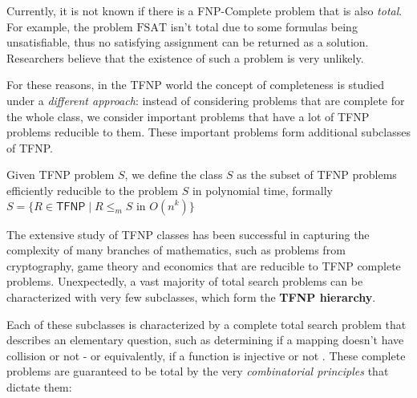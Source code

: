 Currently, it is not known if there is a \textsf{FNP}-Complete problem that is also \textit{total}. For example, the problem $\mathrm{FSAT}$ isn't total due to some formulas being unsatisfiable, thus no satisfying assignment can be returned as a solution. Researchers believe that the existence of such a problem is very unlikely. 

For these reasons, in the \textsf{TFNP} world the concept of completeness is studied under a \textit{different approach}: instead of considering problems that are complete for the whole class, we consider important problems that have a lot of \textsf{TFNP} problems reducible to them. These important problems form additional subclasses of \textsf{TFNP}.  

\begin{definition}
 Given \textsf{TFNP} problem $S$, we define the class $S$ as the subset of \textsf{TFNP} problems efficiently reducible to the problem $S$ in polynomial time, formally $S = \{R \in \mathsf{TFNP} \mid R \leq_m S \text{ in } O(n^k)\}$
\end{definition}

The extensive study of \textsf{TFNP} classes has been successful in capturing the complexity of many branches of mathematics, such as problems from cryptography, game theory and economics that are reducible to TFNP complete problems. Unexpectedly, a vast majority of total search problems can be characterized with very few subclasses, which form the \textbf{\textsf{TFNP} hierarchy}. 

\newpage

Each of these subclasses is characterized by a complete total search problem that describes an elementary question, such as determining if a mapping doesn't have collision or not - or equivalently, if a function is injective or not \cite{proofs_circuits_communication,tfnp_characterization}. These complete problems are guaranteed to be total by the very \textit{combinatorial principles} that dictate them:

